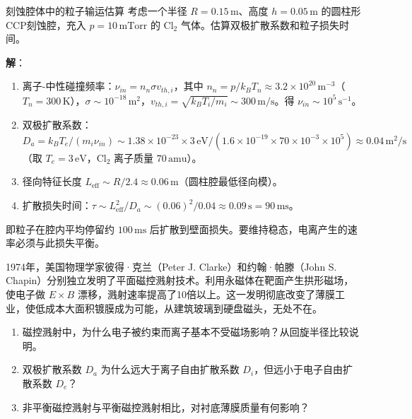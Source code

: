 \begin{example}{刻蚀腔体中的粒子输运估算}{}{}
\label{ex:etcher-transport}
考虑一个半径 $R = 0.15\,\mathrm{m}$、高度 $h = 0.05\,\mathrm{m}$ 的圆柱形CCP刻蚀腔，充入 $p = 10\,\mathrm{mTorr}$ 的 $\mathrm{Cl}_2$ 气体。估算双极扩散系数和粒子损失时间。

\textbf{解}：
\begin{enumerate}
\item 离子-中性碰撞频率：$\nu_{in} = n_n \sigma v_{th,i}$，其中 $n_n = p/k_B T_n \approx 3.2\times 10^{20}\,\mathrm{m^{-3}}$（$T_n = 300\,\mathrm{K}$），$\sigma \sim 10^{-18}\,\mathrm{m^2}$，$v_{th,i} = \sqrt{k_B T_i/m_i} \sim 300\,\mathrm{m/s}$。得 $\nu_{in} \sim 10^5\,\mathrm{s^{-1}}$。
\item 双极扩散系数：$D_a = k_B T_e/(m_i \nu_{in}) \sim 1.38\times 10^{-23} \times 3\,\mathrm{eV} / (1.6\times 10^{-19} \times 70\times 10^{-3} \times 10^5) \approx 0.04\,\mathrm{m^2/s}$（取 $T_e = 3\,\mathrm{eV}$，$\mathrm{Cl}_2$ 离子质量 $70\,\mathrm{amu}$）。
\item 径向特征长度 $L_{\text{eff}} \sim R/2.4 \approx 0.06\,\mathrm{m}$（圆柱腔最低径向模）。
\item 扩散损失时间：$\tau \sim L_{\text{eff}}^2/D_a \sim (0.06)^2/0.04 \approx 0.09\,\mathrm{s} = 90\,\mathrm{ms}$。
\end{enumerate}

即粒子在腔内平均停留约 $100\,\mathrm{ms}$ 后扩散到壁面损失。要维持稳态，电离产生的速率必须与此损失平衡。
\end{example}

\begin{history}{}{}
1974年，美国物理学家彼得·克兰（Peter J. Clarke）和约翰·帕滕（John S. Chapin）分别独立发明了平面磁控溅射技术。利用永磁体在靶面产生拱形磁场，使电子做 $E\times B$ 漂移，溅射速率提高了10倍以上。这一发明彻底改变了薄膜工业，使低成本大面积镀膜成为可能，从建筑玻璃到硬盘磁头，无处不在。
\end{history}

\begin{miniquiz}
\begin{enumerate}
\item 磁控溅射中，为什么电子被约束而离子基本不受磁场影响？从回旋半径比较说明。
\item 双极扩散系数 $D_a$ 为什么远大于离子自由扩散系数 $D_i$，但远小于电子自由扩散系数 $D_e$？
\item 非平衡磁控溅射与平衡磁控溅射相比，对衬底薄膜质量有何影响？
\end{enumerate}
\end{miniquiz}

